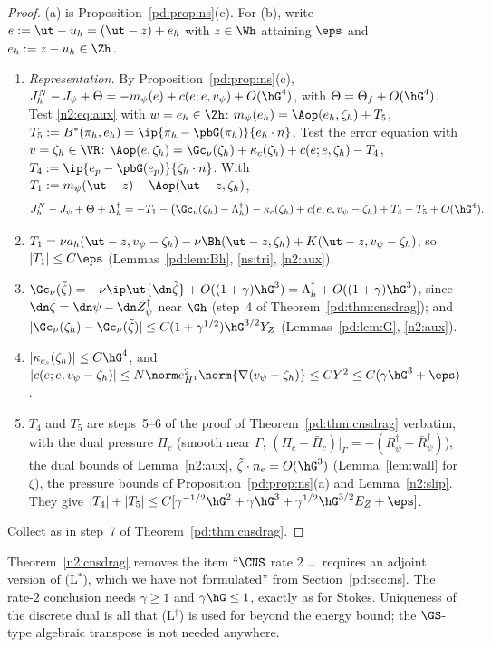 \begin{proof}
(a) is Proposition~\ref{pd:prop:ns}(c). For (b), write $e:=\ut-u_h=(\ut-z)+e_h$ with $z\in\Wh$ attaining $\eps$ and $e_h:=z-u_h\in\Zh$.
\begin{enumerate}
\item \emph{Representation.} By Proposition~\ref{pd:prop:ns}(c), $J^N_h-J_\psi+\Theta=-m_\psi(e)+c(e;e,v_\psi)+O(\hG^4)$, with $\Theta=\Theta_f+O(\hG^4)$.
Test \eqref{n2:eq:aux} with $w=e_h\in\Zh$: $m_\psi(e_h)=\Aop(e_h,\zeta_h)+T_5$, $T_5:=B^\ast(\pi_h,e_h)=\ip{\pi_h-\pbG(\pi_h)}{e_h\cdot n}$.
Test the error equation with $v=\zeta_h\in\VR$: $\Aop(e,\zeta_h)=\Gc_\nu(\zeta_h)+\kappa_c(\zeta_h)+c(e;e,\zeta_h)-T_4$, $T_4:=\ip{e_p-\pbG(e_p)}{\zeta_h\cdot n}$.
With $T_1:=m_\psi(\ut-z)-\Aop(\ut-z,\zeta_h)$,
\[
J^N_h-J_\psi+\Theta+\Lambda^\dagger_h=-T_1-\bigl(\Gc_\nu(\zeta_h)-\Lambda^\dagger_h\bigr)-\kappa_c(\zeta_h)+c(e;e,v_\psi-\zeta_h)+T_4-T_5+O(\hG^4).
\]
\item $T_1=\nu a_h(\ut-z,v_\psi-\zeta_h)-\nu\Bh(\ut-z,\zeta_h)+K(\ut-z,v_\psi-\zeta_h)$, so $|T_1|\le C\eps$ (Lemmas~\ref{pd:lem:Bh}, \ref{ns:tri}, \ref{n2:aux}).
\item $\Gc_\nu(\tilde\zeta)=-\nu\ip\ut{\dn\tilde\zeta}+O((1+\gamma)\hG^3)=\Lambda^\dagger_h+O((1+\gamma)\hG^3)$, since $\dn\tilde\zeta=\dn\psi-\dn\tilde Z^\dagger_\psi$
near $\Gh$ (step~4 of Theorem~\ref{pd:thm:cnsdrag}); and $|\Gc_\nu(\zeta_h)-\Gc_\nu(\tilde\zeta)|\le C(1+\gamma^{1/2})\hG^{3/2}Y_Z$ (Lemmas~\ref{pd:lem:G}, \ref{n2:aux}).
\item $|\kappa_{c_s}(\zeta_h)|\le C\hG^4$, and $|c(e;e,v_\psi-\zeta_h)|\le N\norm e^2_{H^1}\norm{\nabla(v_\psi-\zeta_h)}\le CY^2\le C(\gamma\hG^3+\eps)$.
\item $T_4$ and $T_5$ are steps~5--6 of the proof of Theorem~\ref{pd:thm:cnsdrag} verbatim, with the dual pressure $\Pi_c$ (smooth near $\Gamma$,
$(\Pi_c-\bar\Pi_c)|_\Gamma=-(R^\dagger_\psi-\bar R^\dagger_\psi)$), the dual bounds of Lemma~\ref{n2:aux}, $\tilde\zeta\cdot n_e=O(\hG^3)$ (Lemma~\ref{lem:wall} for $\zeta$),
the pressure bounds of Proposition~\ref{pd:prop:ns}(a) and Lemma~\ref{n2:slip}. They give $|T_4|+|T_5|\le C[\gamma^{-1/2}\hG^2+\gamma\hG^3+\gamma^{1/2}\hG^{3/2}E_Z+\eps]$.
\end{enumerate}
Collect as in step~7 of Theorem~\ref{pd:thm:cnsdrag}.
\end{proof}

\begin{remark}\label{n2:rem:drag}
Theorem~\ref{n2:cnsdrag} removes the item ``$\CNS$ rate $2$ \dots\ requires an adjoint version of (L$^\ast$), which we have not formulated'' from
Section~\ref{pd:sec:ns}. The rate-$2$ conclusion needs $\gamma\ge1$ and $\gamma\hG\le1$, exactly as for Stokes. Uniqueness of the discrete dual is
all that (L$^\dagger$) is used for beyond the energy bound; the $\GS$-type algebraic transpose is not needed anywhere.
\end{remark}

